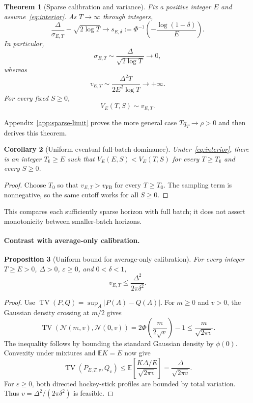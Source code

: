 \documentclass[11pt]{article}
\newtheorem{theorem}{Theorem}[section]
\newtheorem{proposition}[theorem]{Proposition}
\newtheorem{corollary}[theorem]{Corollary}
\theoremstyle{remark}
\newcommand{\E}{\mathbb E}
\newcommand{\Normal}{\mathcal N}
\newcommand{\TV}{\operatorname{TV}}
\begin{document}
\begin{theorem}[Sparse calibration and variance]\label{thm:smallbatch}
Fix a positive integer $E$ and assume~\eqref{eq:interior}. As $T\to\infty$
through integers,
\[
 \frac{\Delta}{\sigma_{E,T}}-\sqrt{2\log T}
 \longrightarrow s_{E,\delta}:=
 \Phi^{-1}\!\left(-\frac{\log(1-\delta)}{E}\right).
\]
In particular,
\begin{equation}\label{eq:sigmaasymptotic}
 \sigma_{E,T}\sim\frac{\Delta}{\sqrt{2\log T}}\longrightarrow0,
\end{equation}
whereas
\begin{equation}\label{eq:privacydivergence}
 v_{E,T}\sim\frac{\Delta^2T}{2E^2\log T}\longrightarrow+\infty.
\end{equation}
For every fixed $S\geq0$,
\begin{equation}\label{eq:total-equivalent}
 V_E(T,S)\sim v_{E,T}.
\end{equation}
\end{theorem}

Appendix~\ref{app:sparse-limit} proves the more general case $Tq_T\to\rho>0$
and then derives this theorem.

\begin{corollary}[Uniform eventual full-batch dominance]\label{cor:eventual}
Under~\eqref{eq:interior}, there is an integer $T_0\geq E$ such that
$V_E(E,S)<V_E(T,S)$ for every $T\geq T_0$ and every $S\geq0$.
\end{corollary}

\begin{proof}
Choose $T_0$ so that $v_{E,T}>v_{\mathrm{FB}}$ for every $T\geq T_0$.
The sampling term is nonnegative, so the same cutoff works for all $S\geq0$.
\end{proof}

This compares each sufficiently sparse horizon with full batch; it does not
assert monotonicity between smaller-batch horizons.

\paragraph{Contrast with average-only calibration.}
\begin{proposition}[Uniform bound for average-only calibration]
\label{prop:average-uniform-bound}
For every integer $T\geq E>0$, $\Delta>0$, $\varepsilon\geq0$, and
$0<\delta<1$,
\[
 \overline v_{E,T}\leq\frac{\Delta^2}{2\pi\delta^2}.
\]
\end{proposition}

\begin{proof}
Use $\TV(P,Q)=\sup_A|P(A)-Q(A)|$. For $m\geq0$ and $v>0$, the Gaussian
density crossing at $m/2$ gives
\[
 \TV(\Normal(m,v),\Normal(0,v))
 =2\Phi\!\left(\frac{m}{2\sqrt v}\right)-1
 \leq\frac{m}{\sqrt{2\pi v}}.
\]
The inequality follows by bounding the standard Gaussian density by
$\phi(0)$. Convexity under mixtures and $\E K=E$ now give
\[
 \TV(\overline P_{E,T,v},\overline Q_v)
 \leq\E\!\left[\frac{K\Delta/E}{\sqrt{2\pi v}}\right]
 =\frac{\Delta}{\sqrt{2\pi v}}.
\]
For $\varepsilon\geq0$, both directed hockey-stick profiles are bounded
by total variation. Thus $v=\Delta^2/(2\pi\delta^2)$ is feasible.
\end{proof}
\end{document}
